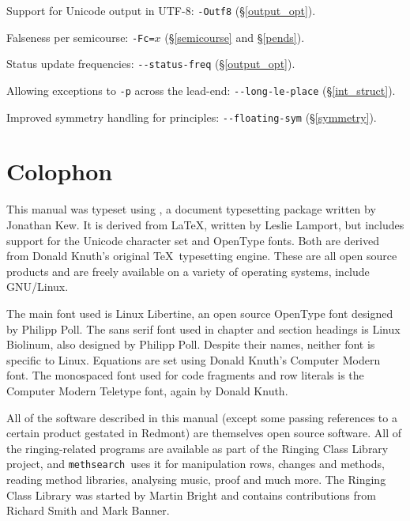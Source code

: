 \documentclass[a4paper,11pt,oneside]{book}
\def\methsearch{\texttt{meth\-search}}
\newcommand{\sref}[1]{\hyperref[#1]{\S\ref{#1}}}
\begin{document}
\begin{list}{}{\leftmargin=1em\itemsep=0em}
\item Support for Unicode output in UTF-8: \verb+-Outf8+ (\sref{output_opt}).
\item Falseness per semicourse: \verb+-Fc=+$x$ (\sref{semicourse} and
  \sref{pends}).
\item Status update frequencies: \verb+--status-freq+ (\sref{output_opt}).
\item Allowing exceptions to \verb+-p+ across the lead-end: 
  \verb+--long-le-place+ (\sref{int_struct}).
\item Improved symmetry handling for principles: 
  \verb+--floating-sym+ (\sref{symmetry}).
\end{list}

\clearpage
{}
\footnotesize
{}

\normalsize
\chapter*{Colophon}

This manual was typeset using \XeTeX{}, a document 
typesetting package written by Jonathan Kew.  It is derived from 
\LaTeX, written by Leslie Lamport, but includes support for the Unicode 
character set and OpenType fonts.
Both are derived from Donald Knuth's original \TeX\ typesetting engine.  
These are all open source products and are freely available on a variety of 
operating systems, include GNU/Linux. 

The main font used is Linux Libertine, an open source OpenType font designed
by Philipp Poll.  The sans serif font used in chapter and section headings
is Linux Biolinum, also designed by Philipp Poll.  Despite their names,
neither font is specific to Linux.  Equations are set using Donald Knuth's 
Computer Modern font.  The monospaced font used for code fragments and
row literals is the Computer Modern Teletype font, again by Donald Knuth.%

All of the software described in this manual (except some passing
references to a certain product gestated in Redmont) are themselves open
source software.  All of the ringing-related programs are available as 
part of the Ringing Class Library project,
and \methsearch\ uses it for manipulation rows, changes and methods, 
reading method libraries, analysing music, proof and much more.  
The Ringing Class Library was started by Martin Bright and contains
contributions from Richard Smith and Mark Banner.
\end{document}
